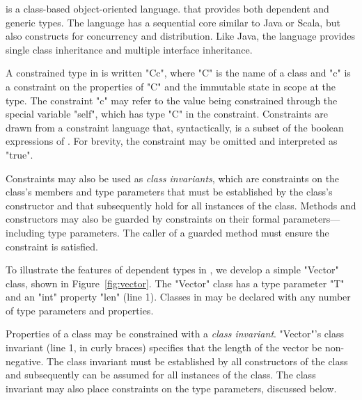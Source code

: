 \Xten{} is a class-based object-oriented language.
that provides both dependent and generic types.
The language has a sequential core similar to Java or Scala, but
also
constructs for concurrency and distribution.
Like Java, the language provides single class
inheritance and multiple interface inheritance.

A constrained type in \Xten{} is written \xcd"C{c}", where \xcd"C" is the
name of a class and \xcd"c" is a constraint on the properties
of \xcd"C" and the immutable state in scope at the type.  The
constraint \xcd"c" may refer to the value being constrained through
the special variable \xcd"self", which has type \xcd"C" in the
constraint.  Constraints are drawn from a constraint language that,
syntactically, is a subset of the boolean expressions of \Xten{}.  For
brevity, the constraint may be omitted and interpreted as \xcd"true".

Constraints may also be used as \emph{class invariants}, 
which are constraints on the class's members and type parameters 
that must be established by the class's
constructor and that subsequently hold for all instances of the class.
Methods and constructors may also be guarded by constraints on
their formal parameters---including type parameters. The
caller of a guarded method must ensure the constraint is
satisfied.

To illustrate the features of dependent types in \Xten{}, we
develop a simple \xcd"Vector"
class, shown in Figure~\ref{fig:vector}.
The \xcd"Vector" class has a type parameter \xcd"T" and an \xcd"int"
property \xcd"len" (line 1).
Classes in \Xten{} may be declared with any number of type
parameters and properties.

Properties of a class may be constrained with 
a \emph{class invariant}.
\xcd"Vector"'s class invariant (line 1, in curly braces)
specifies that the length of
the vector be non-negative.
The class invariant must be established by all constructors of
the class and subsequently can be assumed for all instances of the class.
The class invariant may also place constraints on the type
parameters, discussed below.


